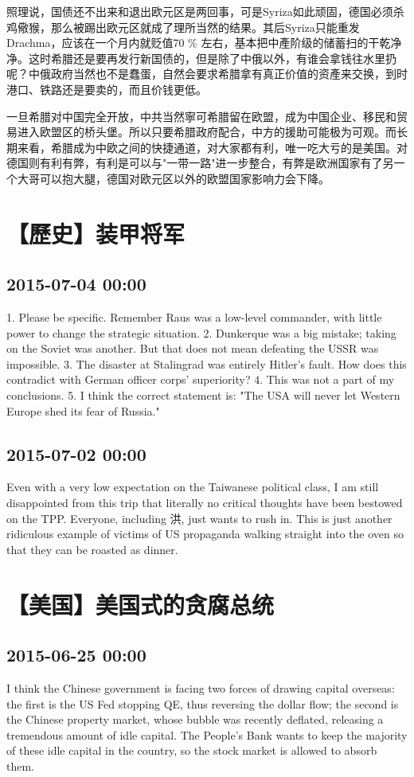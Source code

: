 \documentclass[twocolumn]{ctexart}
\begin{document}
照理说，国债还不出来和退出欧元区是两回事，可是Syriza如此顽固，德国必须杀鸡儆猴，那么被踢出欧元区就成了理所当然的结果。其后Syriza只能重发Drachma，应该在一个月内就贬值70 \% 左右，基本把中產阶级的储蓄扫的干乾净净。这时希腊还是要再发行新国债的，但是除了中俄以外，有谁会拿钱往水里扔呢？中俄政府当然也不是蠢蛋，自然会要求希腊拿有真正价值的资產来交换，到时港口、铁路还是要卖的，而且价钱更低。

一旦希腊对中国完全开放，中共当然寧可希腊留在欧盟，成为中国企业、移民和贸易进入欧盟区的桥头堡。所以只要希腊政府配合，中方的援助可能极为可观。而长期来看，希腊成为中欧之间的快捷通道，对大家都有利，唯一吃大亏的是美国。对德国则有利有弊，有利是可以与"一带一路"进一步整合，有弊是欧洲国家有了另一个大哥可以抱大腿，德国对欧元区以外的欧盟国家影响力会下降。\section*{【歷史】装甲将军}
\subsection*{2015-07-04 00:00}
1. Please be specific. Remember Raus was a low-level commander, with little power to change the strategic situation.
2. Dunkerque was a big mistake; taking on the Soviet was another. But that does not mean defeating the USSR was impossible.
3. The disaster at Stalingrad was entirely Hitler's fault. How does this contradict with German officer corps' superiority?
4. This was not a part of my conclusions.
5. I think the correct statement is: "The USA will never let Western Europe shed its fear of Russia."\subsection*{2015-07-02 00:00}
Even with a very low expectation on the Taiwanese political class, I am still disappointed from this trip that literally no critical thoughts have  been bestowed on the TPP. Everyone, including 洪, just wants to rush in. This is just another ridiculous example of victims of US propaganda walking straight into the oven so that they can be roasted as dinner.\section*{【美国】美国式的贪腐总统}
\subsection*{2015-06-25 00:00}
I think the Chinese government is facing two forces of drawing capital overseas: the first is the US Fed stopping QE, thus reversing the dollar flow; the second is the Chinese property market, whose bubble was recently deflated, releasing a tremendous amount of idle capital. The People's Bank wants to keep the majority of these idle capital in the country, so the stock market is allowed to absorb them.
\end{document}
